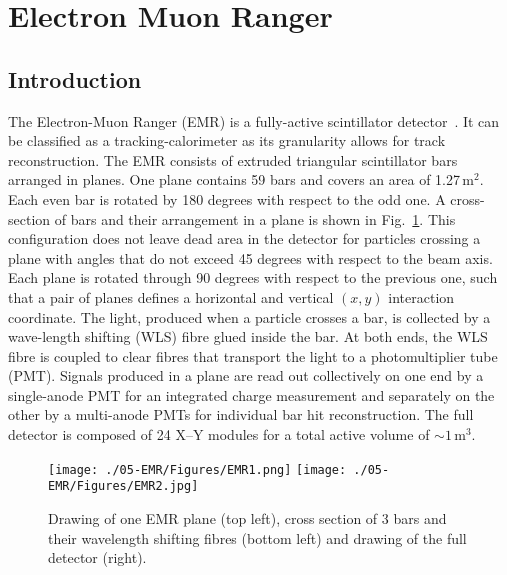 \graphicspath{{05-EMR/Figures/}}

\section{Electron Muon Ranger}
\label{Sect:EMR}

\subsection{Introduction}
\label{SubSect:EMR_Intro}
The Electron-Muon Ranger (EMR) is a fully-active scintillator detector~\cite{2016JInst..11T10007}. It can be classified as a tracking-calorimeter as its granularity allows for track reconstruction. The EMR consists of extruded triangular scintillator bars arranged in planes. One plane contains 59 bars and covers an area of 1.27\,m$^2$. Each even bar is rotated by 180 degrees with respect to the odd one. A cross-section of bars and their arrangement in a plane is shown in Fig.~\ref{fig:EMR}. This configuration does not leave dead area in the detector for particles crossing a plane with angles that do not exceed 45 degrees with respect to the beam axis. Each plane is rotated through 90 degrees with respect to the previous one, such that a pair of planes defines a horizontal and vertical $(x, y)$ interaction coordinate. The light, produced when a particle crosses a bar, is collected by a wave-length shifting (WLS) fibre glued inside the bar. At both ends, the WLS fibre is coupled to clear fibres that transport the light to a photomultiplier tube (PMT). Signals produced in a plane are read out collectively on one end by a single-anode PMT for an integrated charge measurement and separately on the other by a multi-anode PMTs for individual bar hit reconstruction. The full detector is composed of 24 X--Y modules for a total active volume of $\sim 1$\,m$^3$.

\begin{figure}
	\begin{center}
		\texttt{[image: ./05-EMR/Figures/EMR1.png]}
		\hfill
		\texttt{[image: ./05-EMR/Figures/EMR2.jpg]}
		\caption{Drawing of one EMR plane (top left), cross section of 3 bars and their wavelength shifting fibres (bottom left) and drawing of the full detector (right).}
		\label{fig:EMR}
	\end{center}
\end{figure}

